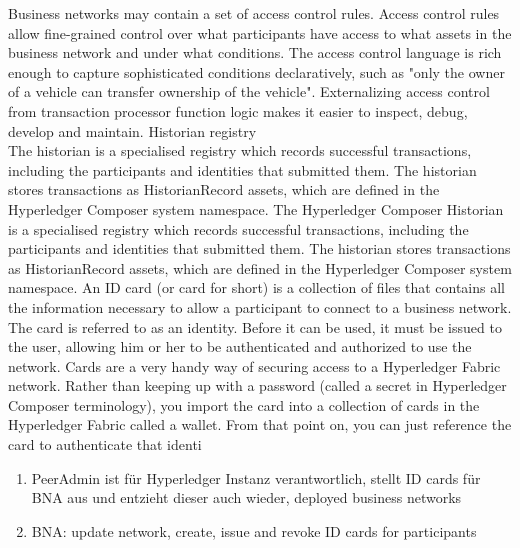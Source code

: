 Business networks may contain a set of access control rules. Access control rules allow fine-grained control over what participants have access to what assets in the business network and under what conditions. The access control language is rich enough to capture sophisticated conditions declaratively, such as "only the owner of a vehicle can transfer ownership of the vehicle". Externalizing access control from transaction processor function logic makes it easier to inspect, debug, develop and maintain.
\medskip
Historian registry\\
The historian is a specialised registry which records successful transactions, including the participants and identities that submitted them. The historian stores transactions as HistorianRecord assets, which are defined in the Hyperledger Composer system namespace.
\medskip
The Hyperledger Composer Historian is a specialised registry which records successful transactions, including the participants and identities that submitted them. The historian stores transactions as HistorianRecord assets, which are defined in the Hyperledger Composer system namespace.
\medskip
An ID card (or card for short) is a collection of files that contains all the information necessary to allow a participant to connect to a business network. The card is referred to as an identity. Before it can be used, it must be issued to the user, allowing him or her to be authenticated and authorized to use the network. Cards are a very handy way of securing access to a Hyperledger Fabric network. Rather than keeping up with a password (called a secret in Hyperledger Composer terminology), you import the card into a collection of cards in the Hyperledger Fabric called a wallet. From that point on, you can just reference the card to authenticate that identi
\begin{enumerate}
    \item PeerAdmin ist für Hyperledger Instanz verantwortlich, stellt ID cards für BNA aus und entzieht dieser auch wieder, deployed business networks
    \item BNA: update network, create, issue and revoke ID cards for participants
\end{enumerate}

